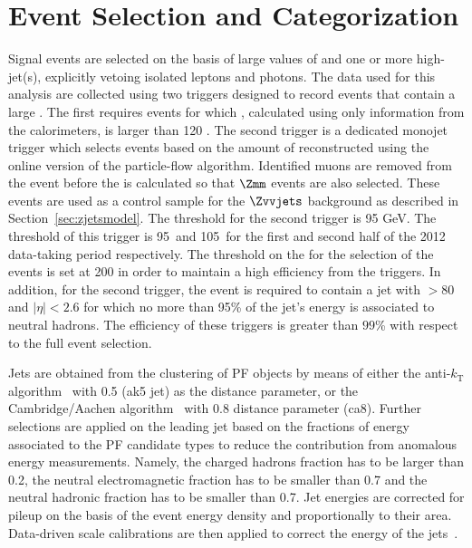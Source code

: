 \section{Event Selection and Categorization}\label{sec:selection}

Signal events are selected on the basis of large values of \ETm and one or more high-\pt jet(s), 
explicitly vetoing isolated leptons and photons. The data used for this analysis are collected using two triggers designed to record events that 
contain a large \ETm. The first requires events for which \ETm, calculated using only information from the calorimeters, is larger 
than 120 \gev. The second trigger is a dedicated monojet trigger which selects events 
based on the amount of \ETm reconstructed using the online version of the particle-flow algorithm. Identified muons are 
removed from the event before the \ETm is calculated so that $\Zmm$ events are also selected. These events are   
used as a control sample for the $\Zvvjets$ background as described in Section~\ref{sec:zjetsmodel}. The \ETm threshold for the second trigger is 95 GeV. 
The \ETm threshold of this trigger is 95~\gev and 105~\gev for the first and second half of the 2012 
data-taking period respectively. The threshold on the \ETm for the selection of the events 
is set at 200 \gev in order to maintain a high efficiency from the triggers.
In addition, for the second trigger, the event is required to contain a jet with \pt$>80$ \gev and $|\eta|<2.6$ for 
which no more than 95\% of the jet's energy is associated to neutral hadrons. The efficiency of these triggers 
is greater than $99$\% with respect to the full event selection. 

Jets are obtained from the clustering of PF objects 
by means of either the anti-$k_{\textrm{T}}$ algorithm~\cite{Cacciari:2008gp} with 0.5 (ak5 jet) as the distance parameter,  
or the Cambridge/Aachen algorithm~\cite{cajets} with 0.8 distance parameter (ca8). 
Further selections are applied on the leading jet based
on the fractions of energy associated to the PF candidate types to reduce the contribution from 
anomalous energy measurements. Namely, the charged hadrons fraction has to be larger than 0.2, 
the neutral electromagnetic fraction has to be smaller than 0.7 
and the neutral hadronic fraction has to be smaller than 0.7.
Jet energies are corrected for pileup on the basis of the event energy density and 
proportionally to their area. Data-driven scale calibrations are then applied to correct the energy of the 
jets~\cite{jec}.

